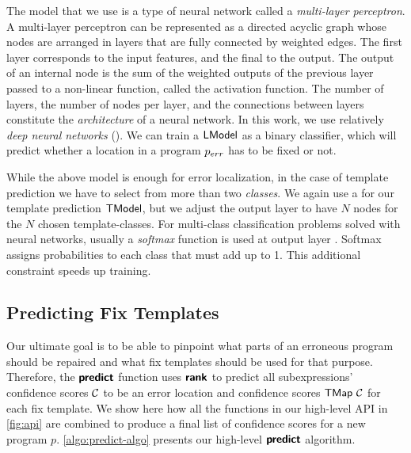 The model that we use is a type of neural network called a \emph{multi-layer
perceptron}. A multi-layer perceptron can be represented as a directed acyclic
graph whose nodes are arranged in layers that are fully connected by weighted
edges. The first layer corresponds to the input features, and the final to the
output. The output of an internal node is the sum of the weighted
outputs of the previous layer passed to a non-linear function, called the
activation function. The number of layers,
the number of nodes per layer, and the connections between layers constitute the
\emph{architecture} of a neural network. In this work, we use relatively
\emph{deep neural networks} (\dnn). We can train a \dnn $\mathsf{LModel}$ as a
binary classifier, which will predict whether a location in a program $p_{err}$
has to be fixed or not.

While the above model is enough for error localization, in the case of template
prediction we have to select from more than two \emph{classes}. We again use a
\dnn for our template prediction $\mathsf{TModel}$, but we adjust the output layer to
have $N$ nodes for the $N$ chosen template-classes. For multi-class
classification problems solved with neural networks, usually a \emph{softmax}
function is used at output layer \citep{Goodfellow-et-al-2016,Bishop-book-2006}.
Softmax assigns probabilities to each class that must add up to 1.
This additional constraint speeds up training.



\subsection{Predicting Fix Templates}
\label{sec:templ-pred:predict}

Our ultimate goal is to be able to pinpoint what parts of an erroneous program
should be repaired and what fix templates should be used for that purpose.
Therefore, the $\bm{\mathsf{predict}}$ function uses $\bm{\mathsf{rank}}$ to predict all
subexpressions' confidence scores $\mathcal{C}$ to be an error location and confidence
scores $\mathsf{TMap}\ \mathcal{C}$ for each fix template. We show here how all the functions
in our high-level API in \autoref{fig:api} are combined to produce a final list
of confidence scores for a new program $p$. \autoref{algo:predict-algo} presents
our high-level $\bm{\mathsf{predict}}$ algorithm.

